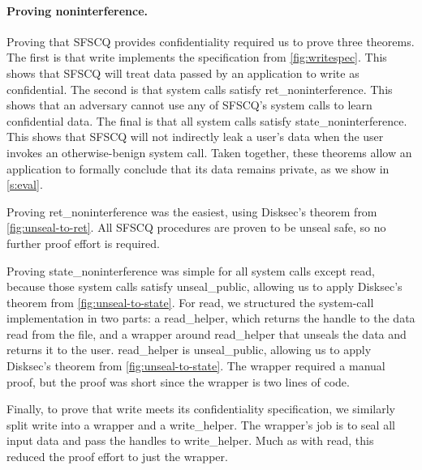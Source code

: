 \paragraph{Proving noninterference.}

Proving that SFSCQ provides confidentiality required us to
prove three theorems.  The first is that {write} implements the
specification from \autoref{fig:writespec}.  This shows that SFSCQ
will treat data passed by an application to {write} as confidential.
The second is that system calls satisfy {ret\_noninterference}.
This shows that an adversary cannot use any of SFSCQ's system calls
to learn confidential data.  The final is that all system calls satisfy
{state\_noninterference}.  This shows that SFSCQ will not indirectly
leak a user's data when the user invokes an otherwise-benign
system call.  Taken together, these theorems allow an application to
formally conclude that its data remains private, as we show in
\autoref{s:eval}.

Proving {ret\_noninterference} was the easiest, using Disksec's theorem
from \autoref{fig:unseal-to-ret}.  All SFSCQ procedures are proven to be
unseal safe, so no further proof effort is required.

Proving {state\_noninterference} was simple for all system
calls except {read}, because those system calls satisfy {unseal\_public},
allowing us to apply Disksec's theorem from \autoref{fig:unseal-to-state}.
For {read}, we structured the system-call implementation in two parts:
a {read\_helper}, which returns the handle to the data read from
the file, and a wrapper around {read\_helper} that unseals the data
and returns it to the user.  {read\_helper} is {unseal\_public},
allowing us to apply Disksec's theorem from \autoref{fig:unseal-to-state}.
The wrapper required a manual proof, but the proof was short since the
wrapper is two lines of code.

Finally, to prove that {write} meets its confidentiality specification,
we similarly split {write} into a wrapper and a {write\_helper}.
The wrapper's job is to seal all input data and pass the handles to
{write\_helper}.  Much as with {read}, this reduced the proof effort
to just the wrapper.
